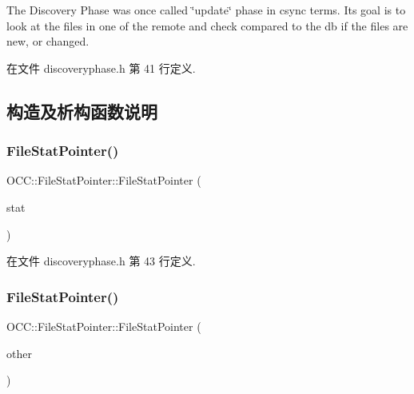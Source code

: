The Discovery Phase was once called \char`\"{}update\char`\"{} phase in csync terms. Its goal is to look at the files in one of the remote and check compared to the db if the files are new, or changed. 

在文件 discoveryphase.\+h 第 41 行定义.



\subsection{构造及析构函数说明}
\mbox{\label{class_o_c_c_1_1_file_stat_pointer_abcd604de0991873f6a6ee99ee25217e0}} 
\subsubsection{\texorpdfstring{File\+Stat\+Pointer()}{FileStatPointer()}\hspace{0.1cm}{\footnotesize\ttfamily [1/2]}}
{\footnotesize\ttfamily O\+C\+C\+::\+File\+Stat\+Pointer\+::\+File\+Stat\+Pointer (\begin{DoxyParamCaption}\item[{csync\+\_\+vio\+\_\+file\+\_\+stat\+\_\+t $\ast$}]{stat }\end{DoxyParamCaption})}



在文件 discoveryphase.\+h 第 43 行定义.

\mbox{\label{class_o_c_c_1_1_file_stat_pointer_a944a29f8508675646dfedfe686352ab1}} 
\subsubsection{\texorpdfstring{File\+Stat\+Pointer()}{FileStatPointer()}\hspace{0.1cm}{\footnotesize\ttfamily [2/2]}}
{\footnotesize\ttfamily O\+C\+C\+::\+File\+Stat\+Pointer\+::\+File\+Stat\+Pointer (\begin{DoxyParamCaption}\item[{const \hyperlink{class_o_c_c_1_1_file_stat_pointer}{File\+Stat\+Pointer} \&}]{other }\end{DoxyParamCaption})}



